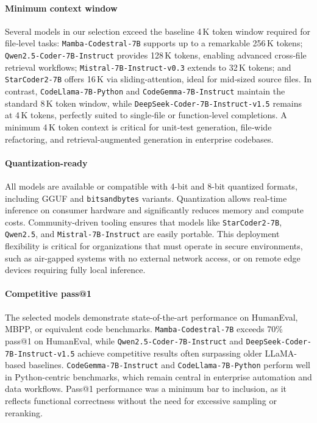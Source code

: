 \paragraph{Minimum context window}
Several models in our selection exceed the baseline 4\,K token window required for file‐level tasks: \texttt{Mamba-Codestral-7B} supports up to a remarkable 256\,K tokens; \texttt{Qwen2.5-Coder-7B-Instruct} provides 128\,K tokens, enabling advanced cross‐file retrieval workflows; \texttt{Mistral-7B-Instruct-v0.3} extends to 32\,K tokens; and \texttt{StarCoder2-7B} offers 16\,K via sliding‐attention, ideal for mid‐sized source files. In contrast, \texttt{CodeLlama-7B-Python} and \texttt{CodeGemma-7B-Instruct} maintain the standard 8\,K token window, while \texttt{DeepSeek-Coder-7B-Instruct-v1.5} remains at 4\,K tokens, perfectly suited to single‐file or function‐level completions. A minimum 4\,K token context is critical for unit‐test generation, file‐wide refactoring, and retrieval‐augmented generation in enterprise codebases.

\paragraph{Quantization-ready}
All models are available or compatible with 4-bit and 8-bit quantized formats, including GGUF and \texttt{bitsandbytes} variants. Quantization allows real-time inference on consumer hardware and significantly reduces memory and compute costs. Community-driven tooling ensures that models like \texttt{StarCoder2-7B}, \texttt{Qwen2.5}, and \texttt{Mistral-7B-Instruct} are easily portable. This deployment flexibility is critical for organizations that must operate in secure environments, such as air-gapped systems with no external network access, or on remote edge devices requiring fully local inference.

\paragraph{Competitive pass@1}
The selected models demonstrate state-of-the-art performance on HumanEval, MBPP, or equivalent code benchmarks. \texttt{Mamba-Codestral-7B} exceeds 70\% pass@1 on HumanEval, while \texttt{Qwen2.5-Coder-7B-Instruct} and \texttt{DeepSeek-Coder-7B-Instruct-v1.5} achieve competitive results often surpassing older LLaMA-based baselines. \texttt{CodeGemma-7B-Instruct} and \texttt{CodeLlama-7B-Python} perform well in Python-centric benchmarks, which remain central in enterprise automation and data workflows. Pass@1 performance was a minimum bar to inclusion, as it reflects functional correctness without the need for excessive sampling or reranking.

